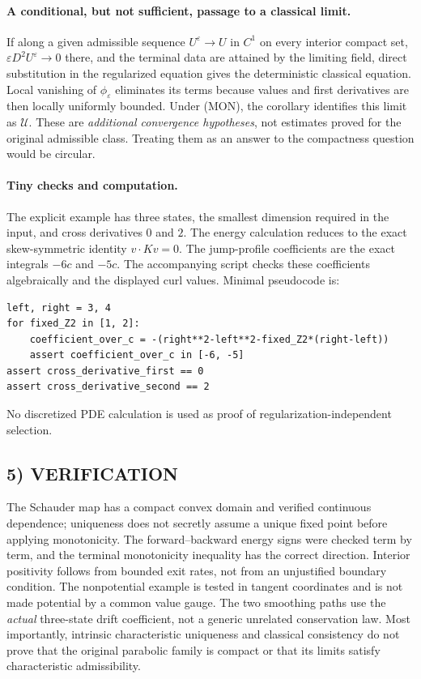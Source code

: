 \documentclass[11pt,a4paper]{article}
\theoremstyle{definition}
\theoremstyle{remark}
\begin{document}
\paragraph{A conditional, but not sufficient, passage to a classical limit.}
If along a given admissible sequence $U^\varepsilon\to U$ in $C^1$ on every interior compact set, $\varepsilon D^2U^\varepsilon\to0$ there, and the terminal data are attained by the limiting field, direct substitution in the regularized equation gives the deterministic classical equation. Local vanishing of $\phi_\varepsilon$ eliminates its terms because values and first derivatives are then locally uniformly bounded. Under (MON), the corollary identifies this limit as $\mathcal U$. These are \emph{additional convergence hypotheses}, not estimates proved for the original admissible class. Treating them as an answer to the compactness question would be circular.

\paragraph{Tiny checks and computation.}
The explicit example has three states, the smallest dimension required in the input, and cross derivatives $0$ and $2$. The energy calculation reduces to the exact skew-symmetric identity $v\cdot Kv=0$. The jump-profile coefficients are the exact integrals $-6c$ and $-5c$. The accompanying script checks these coefficients algebraically and the displayed curl values. Minimal pseudocode is:
\begin{lstlisting}
left, right = 3, 4
for fixed_Z2 in [1, 2]:
    coefficient_over_c = -(right**2-left**2-fixed_Z2*(right-left))
    assert coefficient_over_c in [-6, -5]
assert cross_derivative_first == 0
assert cross_derivative_second == 2
\end{lstlisting}
No discretized PDE calculation is used as proof of regularization-independent selection.

\subsection*{5) VERIFICATION}
The Schauder map has a compact convex domain and verified continuous dependence; uniqueness does not secretly assume a unique fixed point before applying monotonicity. The forward--backward energy signs were checked term by term, and the terminal monotonicity inequality has the correct direction. Interior positivity follows from bounded exit rates, not from an unjustified boundary condition. The nonpotential example is tested in tangent coordinates and is not made potential by a common value gauge. The two smoothing paths use the \emph{actual} three-state drift coefficient, not a generic unrelated conservation law. Most importantly, intrinsic characteristic uniqueness and classical consistency do not prove that the original parabolic family is compact or that its limits satisfy characteristic admissibility.
\end{document}
